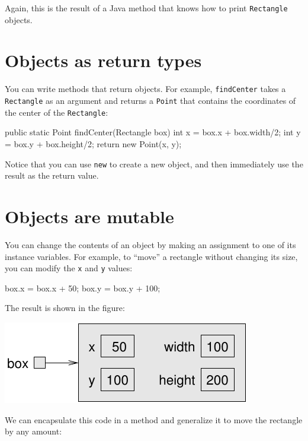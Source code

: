 Again, this is the result of a Java method that knows how
to print {\tt Rectangle} objects.


\section{Objects as return types}

You can write methods that return objects.  For example,
{\tt findCenter} takes a {\tt Rectangle} as an argument and
returns a {\tt Point} that contains the coordinates of the
center of the {\tt Rectangle}:

\begin{code}
  public static Point findCenter(Rectangle box) {
    int x = box.x + box.width/2;
    int y = box.y + box.height/2;
    return new Point(x, y);
  }
\end{code}

Notice that you can use {\tt new} to create a new object,
and then immediately use the result as the return value.


\section{Objects are mutable}

You can change the contents of an object by making an assignment
to one of its instance variables.  For example, to ``move''
a rectangle without changing its size, you can modify the
{\tt x} and {\tt y} values:

\begin{code}
    box.x = box.x + 50;
    box.y = box.y + 100;
\end{code}

The result is shown in the figure:


\includegraphics{figs/rectangle2.pdf}



We can encapsulate this code in a method and
generalize it to move the rectangle by any amount:

